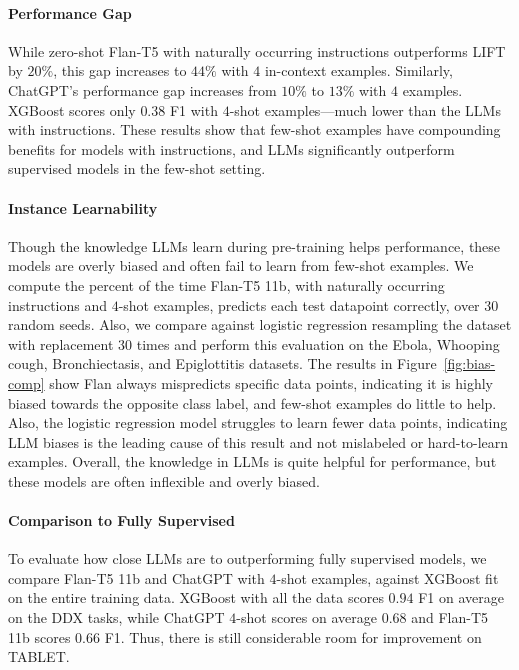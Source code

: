 \paragraph{Performance Gap} 

While zero-shot Flan-T5 with naturally occurring instructions outperforms LIFT by $20\%$, this gap increases to $44\%$ with $4$ in-context examples. Similarly, ChatGPT's performance gap increases from $10\%$ to $13\%$ with $4$ examples. XGBoost scores only $0.38$ F1 with $4$-shot examples—much lower than the LLMs with instructions. These results show that few-shot examples have compounding benefits for models with instructions, and LLMs significantly outperform supervised models in the few-shot setting.

\paragraph{Instance Learnability} Though the knowledge LLMs learn during pre-training helps performance, these models are overly biased and often fail to learn from few-shot examples. We compute the percent of the time Flan-T5 11b, with naturally occurring instructions and $4$-shot examples, predicts each test datapoint correctly, over $30$ random seeds. Also, we compare against logistic regression resampling the dataset with replacement $30$ times and perform this evaluation on the Ebola, Whooping cough, Bronchiectasis, and Epiglottitis datasets. The results in Figure~\ref{fig:bias-comp} show Flan always mispredicts specific data points, indicating it is highly biased towards the opposite class label, and few-shot examples do little to help. Also, the logistic regression model struggles to learn fewer data points, indicating LLM biases is the leading cause of this result and not mislabeled or hard-to-learn examples. Overall, the knowledge in LLMs is quite helpful for performance, but these models are often inflexible and overly biased.

\paragraph{Comparison to Fully Supervised} To evaluate how close LLMs are to outperforming fully supervised models, we compare Flan-T5 11b and ChatGPT with $4$-shot examples, against XGBoost fit on the entire training data. XGBoost with all the data scores $0.94$ F1 on average on the DDX tasks, while ChatGPT $4$-shot scores on average $0.68$ and Flan-T5 11b scores $0.66$ F1. Thus, there is still considerable room for improvement on TABLET.

